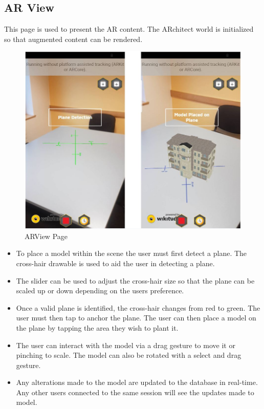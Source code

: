 \subsection{AR View}
This page is used to present the AR content. The ARchitect world is initialized so that augmented content can be rendered.

\begin{figure}[!ht]
\caption{ARView Page}
\centering
\includegraphics[scale=0.55]{images/arview_page.JPG}
\end{figure}

\begin{itemize}
    \item To place a model within the scene the user must first detect a plane. The cross-hair drawable is used to aid the user in detecting a plane. 

    \item The slider can be used to adjust the cross-hair size so that the plane can be scaled up or down depending on the users preference. 
    
    \item Once a valid plane is identified, the cross-hair changes from red to green. The user must then tap to anchor the plane. The user can then place a model on the plane by tapping the area they wish to plant it.
    
    \item The user can interact with the model via a drag gesture to move it or pinching to scale. The model can also be rotated with a select and drag gesture.
    
    \item Any alterations made to the model are updated to the database in real-time. Any other users connected to the same session will see the updates made to model. 


\end{itemize}


